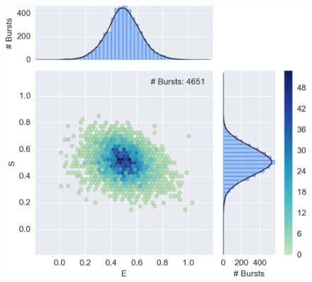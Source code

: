 \begin{figure}
\begin{center}
\includegraphics[width=\singlefig]{"figures/alex_jointplot_fretsel/alex_jointplot_fretsel"}
\caption[]{}
\end{center}
\end{figure}















